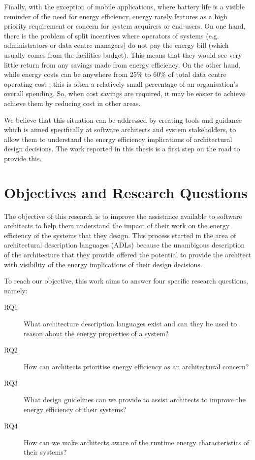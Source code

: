 Finally, with the exception of mobile applications, where battery life is a visible reminder of the need for energy efficiency, energy rarely features as a high priority requirement or concern for system acquirers or end-users. On one hand, there is the problem of split incentives where operators of systems (e.g. administrators or data centre managers) do not pay the energy bill (which usually comes from the facilities budget). This means that they would see very little return from any savings made from energy efficiency. On the other hand, while energy costs can be anywhere from 25\% to 60\% of total data centre operating cost \cite{techuk2013-dcpower}, this is often a relatively small percentage of an organisation's overall spending. So, when cost savings are required, it may be easier to achieve achieve them by reducing cost in other areas.

We believe that this situation can be addressed by creating tools and guidance which is aimed specifically at software architects and system stakeholders, to allow them to understand the energy efficiency implications of architectural design decisions.  The work reported in this thesis is a first step on the road to provide this.

\section{Objectives and Research Questions}

The objective of this research is to improve the assistance available to software architects to help them understand the impact of their work on the energy efficiency of the systems that they design.  This process started in the area of architectural description languages (ADLs) because the unambigous description of the architecture that they provide offered the potential to provide the architect with visibility of the energy implications of their design decisions.

To reach our objective, this work aims to answer four specific research questions, namely:
\nopagebreak
\begin{description}
\item [RQ1] What architecture description languages exist and can they be used to reason about the energy properties of a system?
\item [RQ2] How can architects prioritise energy efficiency as an architectural concern?
\item [RQ3] What design guidelines can we provide to assist architects to improve the energy efficiency of their systems?
\item [RQ4] How can we make architects aware of the runtime energy characteristics of their systems?
\end{description}

